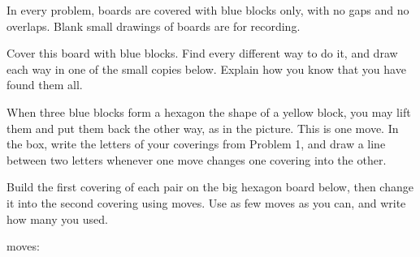 \documentclass[12pt]{article}
\begin{document}
In every problem, boards are covered with blue blocks only, with no gaps and no overlaps. Blank small drawings of boards are for recording.

\bigskip
{} Cover this board with blue blocks. Find every different way to do it, and draw each way in one of the small copies below. Explain how you know that you have found them all.

\vspace{0.3in}

\vspace{0.45in}
\centering
{}\hspace{0.35in}\hspace{0.35in}

\vspace{0.3in}
\hspace{0.35in}\hspace{0.35in}

\vspace{0.3in}
\hspace{0.35in}\hspace{0.35in}

\raggedright
\newpage

 When three blue blocks form a hexagon the shape of a yellow block, you may lift them and put them back the other way, as in the picture. This is one move. In the box, write the letters of your coverings from Problem 1, and draw a line between two letters whenever one move changes one covering into the other.

\vspace{0.3in}
\centering
{}\hspace{0.25in}\raisebox{0.55in}{\lrarrow}\hspace{0.25in}

\vspace{0.35in}
\framebox[\linewidth]{\rule{0pt}{4.6in}}

\raggedright
\newpage

 Build the first covering of each pair on the big hexagon board below, then change it into the second covering using moves. Use as few moves as you can, and write how many you used.

\vspace{0.35in}

\vspace{0.5in}
\hspace{10pt}\hspace{0.2in}\raisebox{0.7in}{\rarrow}\hspace{0.2in}\hspace{0.5in}moves: \blank
\end{document}
